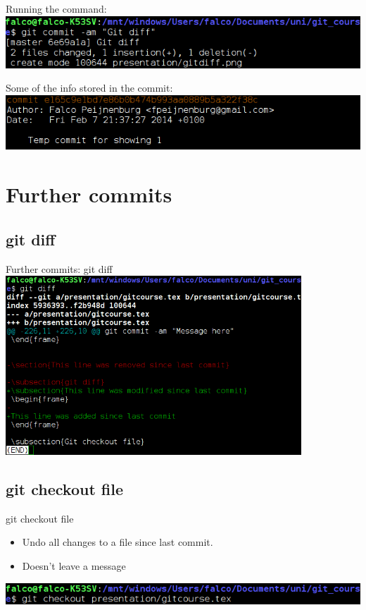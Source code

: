 \documentclass[10pt,a4paper]{beamer}
\begin{document}
\begin{frame}
Running the command:
\includegraphics[width=\linewidth]{gitcommitdone.png}

Some of the info stored in the commit:
\includegraphics[width=\linewidth]{gitlogcommit.png}
\end{frame}

\section{Further commits}

\subsection{git diff}
\begin{frame}{Further commits: git diff}
\includegraphics[width=30em]{gitdiff.png}
\end{frame}

\subsection{git checkout file}
\begin{frame}{git checkout file}
\begin{itemize}
\item Undo all changes to a file since last commit.
\item Doesn't leave a message
\end{itemize}
\includegraphics[width=\linewidth]{gitcheckoutfile.png}
\end{frame}
\end{document}
